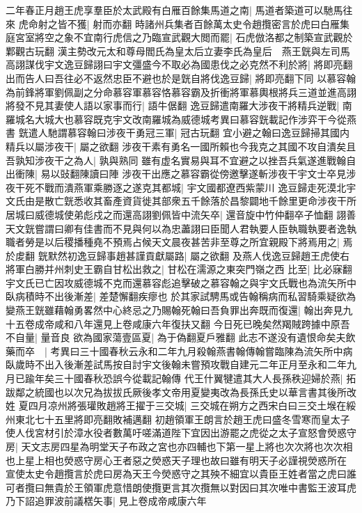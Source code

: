 二年春正月趙王虎享羣臣於太武殿有白雁百餘集馬道之南|{
	馬道者築道可以馳馬往來}
虎命射之皆不獲|{
	射而亦翻}
時諸州兵集者百餘萬太史令趙攬密言於虎曰白雁集庭宮室將空之象不宜南行虎信之乃臨宣武觀大閲而罷|{
	石虎倣洛都之制築宣武觀於鄴觀古玩翻}
漢主勢改元太和尊母閻氏為皇太后立妻李氏為皇后　燕王皝與左司馬高詡謀伐宇文逸豆歸詡曰宇文彊盛今不取必為國患伐之必克然不利於將|{
	將即亮翻}
出而告人曰吾往必不返然忠臣不避也於是皝自將伐逸豆歸|{
	將即亮翻下同}
以慕容翰為前鋒將軍劉佩副之分命慕容軍慕容恪慕容霸及折衝將軍慕輿根將兵三道並進高詡將發不見其妻使人語以家事而行|{
	語牛倨翻}
逸豆歸遣南羅大涉夜干將精兵逆戰|{
	南羅城名大城大也慕容既克宇文改南羅城為威德城考異曰慕容皝載記作涉弈干今從燕書}
皝遣人馳謂慕容翰曰涉夜干勇冠三軍|{
	冠古玩翻}
宜小避之翰曰逸豆歸掃其國内精兵以屬涉夜干|{
	屬之欲翻}
涉夜干素有勇名一國所賴也今我克之其國不攻自潰矣且吾孰知涉夜干之為人|{
	孰與熟同}
雖有虚名實易與耳不宜避之以挫吾兵氣遂進戰翰自出衝陳|{
	易以䜴翻陳讀曰陣}
涉夜干出應之慕容霸從傍邀擊遂斬涉夜干宇文士卒見涉夜干死不戰而潰燕軍乘勝逐之遂克其都城|{
	宇文國都遼西紫蒙川}
逸豆歸走死漠北宇文氏由是散亡皝悉收其畜產資貨徙其部衆五千餘落於昌黎闢地千餘里更命涉夜干所居城曰威德城使弟彪戍之而還高詡劉佩皆中流矢卒|{
	還音旋中竹仲翻卒子恤翻}
詡善天文皝嘗謂曰卿有佳書而不見與何以為忠藎詡曰臣聞人君執要人臣執職執要者逸執職者勞是以后稷播種堯不預焉占候天文晨夜甚苦非至尊之所宜親殿下將焉用之|{
	焉於䖍翻}
皝默然初逸豆歸事趙甚謹貢獻屬路|{
	屬之欲翻}
及燕人伐逸豆歸趙王虎使右將軍白勝并州刺史王霸自甘松出救之|{
	甘松在濡源之東突門嶺之西}
比至|{
	比必寐翻}
宇文氏已亡因攻威德城不克而還慕容彪追擊破之慕容翰之與宇文氏戰也為流矢所中臥病積時不出後漸差|{
	差楚懈翻疾瘳也}
於其家試騁馬或告翰稱病而私習騎乘疑欲為變燕王皝雖藉翰勇畧然中心終忌之乃賜翰死翰曰吾負罪出奔既而復還|{
	翰出奔見九十五卷成帝咸和八年還見上卷咸康六年復扶又翻}
今日死已晚矣然羯賊跨據中原吾不自量|{
	量音良}
欲為國家蕩壹區夏|{
	為于偽翻夏戶雅翻}
此志不遂没有遺恨命矣夫飲藥而卒　|{
	考異曰三十國春秋云永和二年九月殺翰燕書翰傳翰嘗臨陳為流矢所中病臥歲時不出入後漸差試馬按自討宇文後翰未嘗預攻戰自建元二年正月至永和二年九月已踰年矣三十國春秋恐誤今從載記翰傳}
代王什翼犍遣其大人長孫秩迎婦於燕|{
	拓跋鄰之統國也以次兄為拔拔氏厥後孝文帝用夏變夷改為長孫氏史以華言書其後所改姓}
夏四月凉州將張瓘敗趙將王擢于三交城|{
	三交城在朔方之西宋白曰三交土堠在綏州東北七十五里將即亮翻敗補邁翻}
初趙領軍王朗言於趙王虎曰盛冬雪寒而皇太子使人伐宮材引於漳水役者數萬吁嗟滿道陛下宜因出游罷之虎從之太子宣怒會熒惑守房|{
	天文志房四星為明堂天子布政之宮也亦四輔也下第一星上將也次次將也次次相也上星上相也熒惑守房心王者惡之熒惑天子理也故曰雖有明天子必謹視熒惑所在}
宣使太史令趙攬言於虎曰房為天王今熒惑守之其殃不細宜以貴臣王姓者當之虎曰誰可者攬曰無貴於王領軍虎意惜朗使攬更言其次攬無以對因曰其次唯中書監王波耳虎乃下詔追罪波前議楛矢事|{
	見上卷成帝咸康六年}
